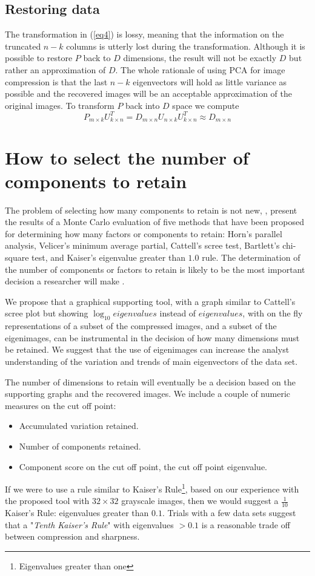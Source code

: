 \documentclass{article} %
\begin{document}
\subsection{Restoring data}
The transformation in (\ref{eq4}) is lossy, meaning that the information on the truncated $n-k$ columns is utterly lost during the transformation. Although it is possible to restore $P$ back to $D$ dimensions, the result will not be exactly $D$ but rather an approximation of $D$. The whole rationale of using PCA for image compression is that the last $n-k$ eigenvectors will hold as little variance as possible and the recovered images will be an acceptable approximation of the original images.
To transform $P$ back into $D$ space we compute \[P_{m\times k}U_{k\times n}^T = D_{m\times n}U_{n\times k}U_{k\times n}^T \approx D_{m\times n}\]
\section{How to select the number of components to retain}
The problem of selecting how many components to retain is not new, \citet{zwick1986comparison}, present the results of a Monte Carlo evaluation of five methods that have been proposed for determining how many factors or components to retain: Horn's parallel analysis, Velicer's minimum average partial, Cattell's scree test, Bartlett's chi-square test, and Kaiser's eigenvalue greater than $1.0$ rule. 
The determination of the number of components or factors to retain is likely to be the most important decision a researcher will make \citep{zwick1986comparison}.\par

We propose that a graphical supporting tool, with a graph similar to Cattell's scree plot but showing $\log_{10} eigenvalues$ instead of $eigenvalues$, with on the fly representations of a subset of the compressed images, and a subset of the eigenimages, can be instrumental in the decision of how many dimensions must be retained. We suggest that the use of eigenimages can increase the analyst understanding of the variation and trends of main eigenvectors of the data set.\par
The number of dimensions to retain will eventually be a decision based on the supporting graphs and the recovered images. We include a couple of numeric measures on the cut off point:
\begin{itemize}
\item Accumulated variation retained.
\item Number of components retained.
\item Component score on the cut off point, the cut off point eigenvalue.
\end{itemize}
If we were to use a rule similar to Kaiser's Rule\footnote{Eigenvalues greater than one}, based on our experience with the proposed tool with $32\times 32$ grayscale images, then we would suggest a $\frac{1}{10}$ Kaiser's Rule: eigenvalues greater than $0.1$. Trials with a few data sets suggest that a "\emph{Tenth Kaiser's Rule}" with eigenvalues $> 0.1$ is a reasonable trade off between compression and sharpness.
\end{document}
